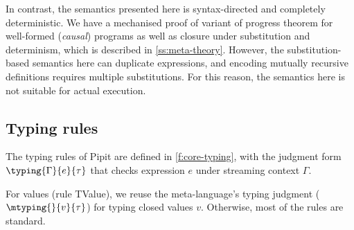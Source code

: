 In contrast, the semantics presented here is syntax-directed and completely deterministic.
We have a mechanised proof of variant of progress theorem for well-formed (\emph{causal}) programs as well as closure under substitution and determinism, which is described in \autoref{ss:meta-theory}.
However, the substitution-based semantics here can duplicate expressions, and encoding mutually recursive definitions requires multiple substitutions.
For this reason, the semantics here is not suitable for actual execution.



\subsection{Typing rules}
\label{ss:typing-rules}

The typing rules of Pipit are defined in \autoref{f:core-typing}, with the judgment form $\typing{\Gamma}{e}{\tau}$ that checks expression $e$ under streaming context $\Gamma$.

For values (rule TValue), we reuse the \fstar{} meta-language's typing judgment ($\mtyping{}{v}{\tau}$) for typing closed values $v$.
Otherwise, most of the rules are standard.

